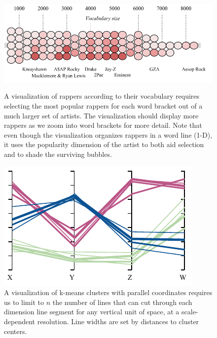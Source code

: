 \documentclass[11pt, oneside]{report}
\begin{document}
\begin{figure}[!t]
     \begin{minipage}{0.62\linewidth}
        \centerline{\includegraphics[width=0.99\linewidth]{figs-glossy/rappers_viz.pdf}}
        \vspace{-1ex}
        \caption{A visualization of rappers according to their vocabulary requires selecting the most popular rappers for each word bracket out of a much larger set of artists. The visualization should display more rappers as we zoom into word brackets for more detail. Note that even though the visualization organizes rappers in a word line (1-D), it uses the popularity dimension of the artist to both aid selection and to shade the surviving bubbles.}\label{fig:example:rappers}
    \end{minipage} \hfill
       \begin{minipage}{0.36\linewidth}
        \centerline{\includegraphics[width=0.99\linewidth]{figs-glossy/parallel_coordinates.pdf}}
        \vspace{-1ex}
        \caption{A visualization of k-means clusters with parallel coordinates requires us to limit to $n$ the number of lines that can cut through each dimension line segment for any vertical unit of space, at a scale-dependent resolution. Line widths are set by distances to cluster centers.} \label{fig:example:clusters}
    \end{minipage} \hfill
\end{figure}
\end{document}
